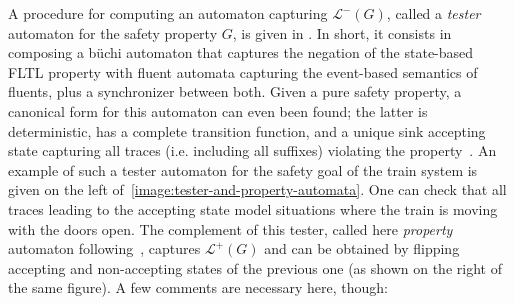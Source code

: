 A procedure for computing an automaton capturing $\mathcal{L}^{-}(G)$, called a \emph{tester} automaton for the safety property $G$, is given in \cite{Giannakopoulou:2003}. In short, it consists in composing a b\"uchi automaton that captures the negation of the state-based FLTL property with fluent automata capturing the event-based semantics of fluents, plus a synchronizer between both. Given a pure safety property, a canonical form for this automaton can even been found; the latter is deterministic, has a complete transition function, and a unique sink accepting state capturing all traces (i.e. including all suffixes) violating the property~\cite{Giannakopoulou:2003}. An example of such a tester automaton for the safety goal of the train system is given on the left of~\ref{image:tester-and-property-automata}. One can check that all traces leading to the accepting state model situations where the train is moving with the doors open. The complement of this tester, called here \emph{property} automaton following~\cite{Letier:2005, Letier:2008}, captures $\mathcal{L}^{+}(G)$ and can be obtained by flipping accepting and non-accepting states of the previous one (as shown on the right of the same figure). A few comments are necessary here, though:

